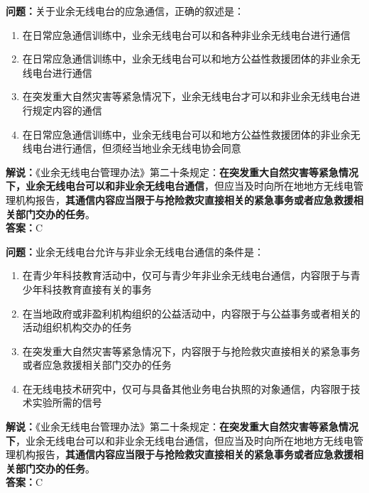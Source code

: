 \documentclass{ctexbook}
\begin{document}
\bigskip


\noindent\textbf{问题：}关于业余无线电台的应急通信，正确的叙述是：
\begin{enumerate}[label=\Alph*), leftmargin=3em]
	\item 在日常应急通信训练中，业余无线电台可以和各种非业余无线电台进行通信
	\item 在日常应急通信训练中，业余无线电台可以和地方公益性救援团体的非业余无线电台进行通信
	\item 在突发重大自然灾害等紧急情况下，业余无线电台才可以和非业余无线电台进行规定内容的通信
	\item 在日常应急通信训练中，业余无线电台可以和地方公益性救援团体的非业余无线电台进行通信，但须经当地业余无线电协会同意
\end{enumerate}
\noindent\textbf{解说：}《业余无线电台管理办法》第二十条规定：\textbf{在突发重大自然灾害等紧急情况下，业余无线电台可以和非业余无线电台通信}，但应当及时向所在地地方无线电管理机构报告，\textbf{其通信内容应当限于与抢险救灾直接相关的紧急事务或者应急救援相关部门交办的任务}。\\\noindent\textbf{答案：}C



\bigskip


\noindent\textbf{问题：}业余无线电台允许与非业余无线电台通信的条件是：
\begin{enumerate}[label=\Alph*), leftmargin=3em]
	\item 在青少年科技教育活动中，仅可与青少年非业余无线电台通信，内容限于与青少年科技教育直接有关的事务
	\item 在当地政府或非盈利机构组织的公益活动中，内容限于与公益事务或者相关的活动组织机构交办的任务
	\item 在突发重大自然灾害等紧急情况下，内容限于与抢险救灾直接相关的紧急事务或者应急救援相关部门交办的任务
	\item 在无线电技术研究中，仅可与具备其他业务电台执照的对象通信，内容限于技术实验所需的信号
\end{enumerate}
\noindent\textbf{解说：}《业余无线电台管理办法》第二十条规定：\textbf{在突发重大自然灾害等紧急情况下}，业余无线电台可以和非业余无线电台通信，但应当及时向所在地地方无线电管理机构报告，\textbf{其通信内容应当限于与抢险救灾直接相关的紧急事务或者应急救援相关部门交办的任务}。\\\noindent\textbf{答案：}C



\bigskip
\end{document}
